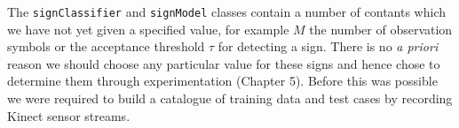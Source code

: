 The \verb|signClassifier| and \verb|signModel| classes contain a number of contants which we have not yet given a specified value, for example $M$ the number of observation symbols or the acceptance threshold $\tau$ for detecting a sign. There is no \emph{a priori} reason we should choose any particular value for these signs and hence chose to determine them through experimentation (Chapter 5). Before this was possible we were required to build a catalogue of training data and test cases by recording Kinect sensor streams.

